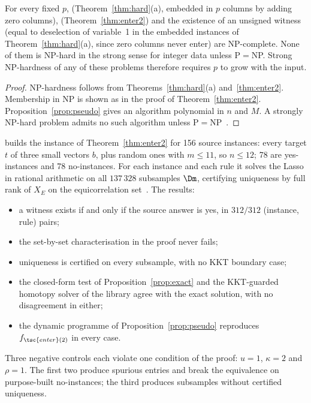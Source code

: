 \begin{corollary}\label{cor:weak}
For every fixed $p$,  (Theorem~\ref{thm:hard}(a), embedded in $p$ columns by adding zero columns),  (Theorem~\ref{thm:enter2}) and the existence of an unsigned  witness (equal to deselection of variable~1 in the embedded instances of Theorem~\ref{thm:hard}(a), since zero columns never enter) are NP-complete. None of them is NP-hard in the strong sense for integer data unless P${}={}$NP. Strong NP-hardness of any of these problems therefore requires $p$ to grow with the input.
\end{corollary}
\begin{proof}
NP-hardness follows from Theorems~\ref{thm:hard}(a) and~\ref{thm:enter2}. Membership in NP is shown as in the proof of Theorem~\ref{thm:enter2}. Proposition~\ref{prop:pseudo} gives an algorithm polynomial in $n$ and $M$. A strongly NP-hard problem admits no such algorithm unless P${}={}$NP~\citep{garey1979}.
\end{proof}

\begin{remark}\label{rem:verify2}
 builds the instance of Theorem~\ref{thm:enter2} for 156 source instances: every target $t$ of three small vectors $b$, plus random ones with $m\le11$, so $n\le12$; 78 are yes-instances and 78 no-instances. For each instance and each rule it solves the Lasso in rational arithmetic on all $137\,328$ subsamples $\Dm$, certifying uniqueness by full rank of $X_E$ on the equicorrelation set~\citep{tibshirani2013}. The results:
\begin{itemize}[leftmargin=2em,itemsep=1pt]
\item a witness exists if and only if the source answer is yes, in $312/312$ (instance, rule) pairs;
\item the set-by-set characterisation in the proof never fails;
\item uniqueness is certified on every subsample, with no KKT boundary case;
\item the closed-form test of Proposition~\ref{prop:exact} and the KKT-guarded homotopy solver of the library agree with the exact solution, with no disagreement in either;
\item the dynamic programme of Proposition~\ref{prop:pseudo} reproduces $f_{\tsc{enter}(2)}$ in every case.
\end{itemize}
Three negative controls each violate one condition of the proof: $u=1$, $\kappa=2$ and $\rho=1$. The first two produce spurious entries and break the equivalence on purpose-built no-instances; the third produces subsamples without certified uniqueness.
\end{remark}

